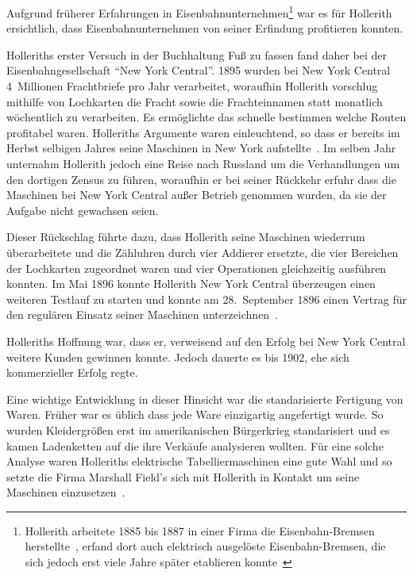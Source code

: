 \documentclass[parskip=half]{scrartcl}
\begin{document}
Aufgrund früherer Erfahrungen in Eisenbahnunternehmen\footnote{Hollerith
arbeitete 1885 bis 1887 in einer Firma die Eisenbahn-Bremsen
herstellte~\cite{heide2009punched}, erfand dort auch elektrisch
ausgelöste Eisenbahn-Bremsen, die sich jedoch erst viele Jahre später
etablieren konnte~\cite{austrian1982herman}} war es für Hollerith
ersichtlich, dass Eisenbahnunternehmen von seiner Erfindung profitieren
konnten.

Holleriths erster Versuch in der Buchhaltung Fuß zu fassen fand daher bei der
Eisenbahngesellschaft \enquote{New York Central}. 1895 wurden bei New York
Central 4~Millionen Frachtbriefe pro Jahr verarbeitet, woraufhin Hollerith
vorschlug mithilfe von Lochkarten die Fracht sowie die Frachteinnamen statt
monatlich wöchentlich zu verarbeiten. Es ermöglichte das schnelle bestimmen
welche Routen profitabel waren. Holleriths Argumente waren einleuchtend, so
dass er bereits im Herbst selbigen Jahres seine Maschinen in New York
aufstellte~\cite{austrian1982herman}. Im selben Jahr unternahm Hollerith jedoch
eine Reise nach Russland um die Verhandlungen um den dortigen Zensus zu führen,
woraufhin er bei seiner Rückkehr erfuhr dass die Maschinen bei New York Central
außer Betrieb genommen wurden, da sie der Aufgabe nicht gewachsen seien.

Dieser Rückschlag führte dazu, dass Hollerith seine Maschinen wiederrum
überarbeitete und die Zähluhren durch vier Addierer ersetzte, die vier
Bereichen der Lochkarten zugeordnet waren und vier Operationen gleichzeitig
ausführen konnten. Im Mai 1896 konnte Hollerith New York Central überzeugen
einen weiteren Testlauf zu starten und konnte am 28.~September 1896 einen
Vertrag für den regulären Einsatz seiner Maschinen
unterzeichnen~\cite{austrian1982herman}.

Holleriths Hoffnung war, dass er, verweisend auf den Erfolg bei New York
Central weitere Kunden gewinnen konnte. Jedoch dauerte es bis 1902, ehe sich
kommerzieller Erfolg regte.

Eine wichtige Entwicklung in dieser Hinsicht war die standarisierte Fertigung
von Waren. Früher war es üblich dass jede Ware einzigartig angefertigt wurde.
So wurden Kleidergrößen erst im amerikanischen Bürgerkrieg standarisiert und es
kamen Ladenketten auf die ihre Verkäufe analysieren wollten. Für eine solche
Analyse waren Holleriths elektrische Tabelliermaschinen eine gute Wahl und so
setzte die Firma Marshall Field's sich mit Hollerith in Kontakt um seine
Maschinen einzusetzen~\cite{austrian1982herman}.
\end{document}
